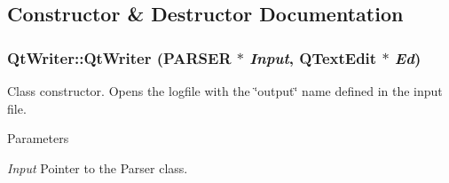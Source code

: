 \subsection{Constructor \& Destructor Documentation}
\hypertarget{classQtWriter_abb998468e7003961ae81e1738c3afffc}{
\subsubsection[{QtWriter}]{\setlength{\rightskip}{0pt plus 5cm}QtWriter::QtWriter ({\bf PARSER} $\ast$ {\em Input}, \/  QTextEdit $\ast$ {\em Ed})}}
\label{classQtWriter_abb998468e7003961ae81e1738c3afffc}
Class constructor. Opens the logfile with the \char`\"{}output\char`\"{} name defined in the input file. 
\begin{DoxyParams}{Parameters}
\item[{\em Input}]Pointer to the Parser class. \end{DoxyParams}


